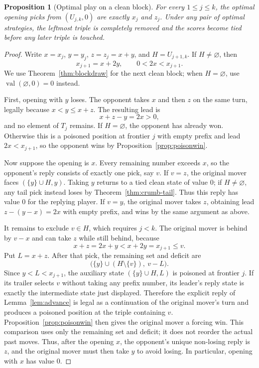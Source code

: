 \documentclass[11pt]{article}
\newtheorem{proposition}[theorem]{Proposition}
\newcommand{\val}{\operatorname{val}}
\begin{document}
\begin{proposition}[Optimal play on a clean block]\label{prop:optimal-clean}
For every $1\le j\le k$, the optimal opening picks from $(U_{j,k},0)$
are exactly $x_j$ and $z_j$. Under any pair of optimal strategies,
the leftmost triple is completely removed and the scores become tied
before any later triple is touched.
\end{proposition}

\begin{proof}
Write $x=x_j$, $y=y_j$, $z=z_j=x+y$, and $H=U_{j+1,k}$.
If $H\ne\varnothing$, then
\[
x_{j+1}=x+2y,\qquad 0<2x<x_{j+1}.
\]
We use Theorem~\ref{thm:blockdraw} for the next clean block;
when $H=\varnothing$, use $\val(\varnothing,0)=0$ instead.

First, opening with $y$ loses. The opponent takes $x$ and then $z$
on the same turn, legally because $x<y\le x+z$. The resulting lead is
\[
x+z-y=2x>0,
\]
and no element of $T_j$ remains. If $H=\varnothing$, the opponent has
already won. Otherwise this is a poisoned position at frontier $j$
with empty prefix and lead $2x<x_{j+1}$, so the opponent wins by
Proposition~\ref{prop:poisonwin}.

Now suppose the opening is $x$. Every remaining number exceeds $x$,
so the opponent's reply consists of exactly one pick, say $v$.
If $v=z$, the original mover faces $(\{y\}\cup H,y)$.
Taking $y$ returns to a tied clean state of value $0$; if $H\ne\varnothing$,
any tail pick instead loses by Theorem~\ref{thm:crumb-tail}.
Thus this reply has value $0$ for the replying player.
If $v=y$, the original mover takes $z$, obtaining lead
$z-(y-x)=2x$ with empty prefix, and wins by the same argument as above.

It remains to exclude $v\in H$, which requires $j<k$.
The original mover is behind by $v-x$ and can take $z$ while still behind,
because
\[
x+z=2x+y<x+2y=x_{j+1}\le v.
\]
Put $L=x+z$. After that pick, the remaining set and deficit are
\[
\bigl(\{y\}\cup(H\setminus\{v\}),\ v-L\bigr).
\]
Since $y<L<x_{j+1}$, the auxiliary state $(\{y\}\cup H,L)$ is poisoned
at frontier $j$. If its trailer selects $v$ without taking any prefix
number, its leader's reply state is exactly the intermediate state
just displayed. Therefore the explicit reply of Lemma~\ref{lem:advance}
is legal as a continuation of the original mover's turn and produces
a poisoned position at the triple containing $v$. Proposition~\ref{prop:poisonwin}
then gives the original mover a forcing win. This comparison uses only
the remaining set and deficit; it does not reorder the actual past moves.
Thus, after the opening $x$, the opponent's unique non-losing reply is $z$,
and the original mover must then take $y$ to avoid losing.
In particular, opening with $x$ has value $0$.


\end{proof}
\end{document}
